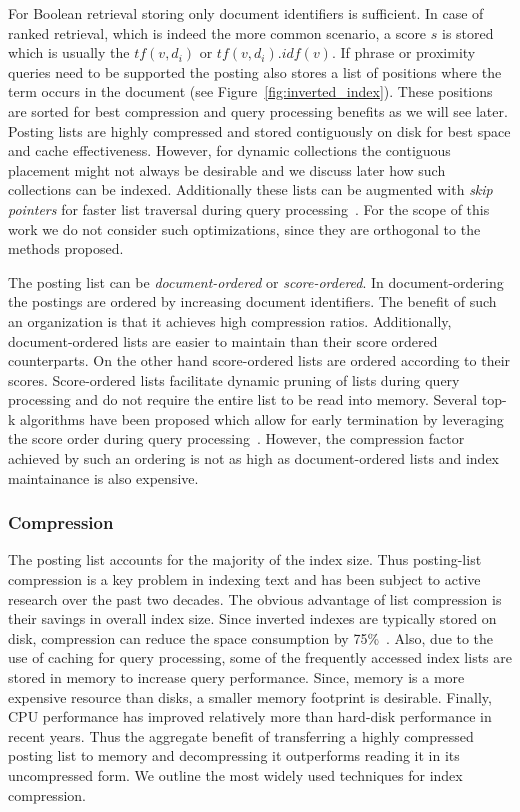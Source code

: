 For Boolean retrieval storing only document identifiers is sufficient. In case of ranked retrieval, which is indeed the more common scenario, a score $s$ is stored which is usually the $tf(v,d_i)$ or $tf(v,d_i).idf(v)$. If phrase or proximity queries need to be supported the posting also stores a list of positions where the term occurs in the document (see Figure~\ref{fig:inverted_index}). These positions are sorted for best compression and query processing benefits as we will see later. Posting lists are highly compressed and stored contiguously on disk for best space and cache effectiveness. However, for dynamic collections the contiguous placement might not always be desirable and we discuss later how such collections can be indexed. Additionally these lists can be augmented with \emph{skip pointers} for faster list traversal during query processing~\cite{DBLP:journals/tois/MoffatZ96}. For the scope of this work we do not consider such optimizations, since they are orthogonal to the methods proposed.

The posting list can be \emph{document-ordered} or \emph{score-ordered}. In document-ordering the postings are ordered by increasing document identifiers. The benefit of such an organization is that it achieves high compression ratios. Additionally, document-ordered lists are easier to maintain than their score ordered counterparts. On the other hand score-ordered lists are ordered according to their scores. Score-ordered lists facilitate dynamic pruning of lists during query processing and do not require the entire list to be read into memory. Several top-k algorithms have been proposed which allow for early termination by leveraging the score order during query processing~\cite{arai2007anytime, fagin2001optimal, bast2006io, theobald2004top,yuan2012efficient}. However, the compression factor achieved by such an ordering is not as high as document-ordered lists and index maintainance is also expensive.

\subsubsection{Compression}

The posting list accounts for the majority of the index size. Thus posting-list compression is a key problem in indexing text and has been subject to active research over the past two decades. The obvious advantage of list compression is their savings in overall index size. Since inverted indexes are typically stored on disk, compression can reduce the space consumption by 75\%~\cite{Manning:2008fk}. Also, due to the use of caching for query processing, some of the frequently accessed index lists are stored in memory to increase query performance. Since, memory is a more expensive resource than disks, a smaller memory footprint is desirable. 
Finally, CPU performance has improved relatively more than hard-disk performance in recent years. Thus the aggregate benefit of transferring a highly compressed posting list to memory and decompressing it outperforms reading it in its uncompressed form. We outline the most widely used techniques for index compression. 

